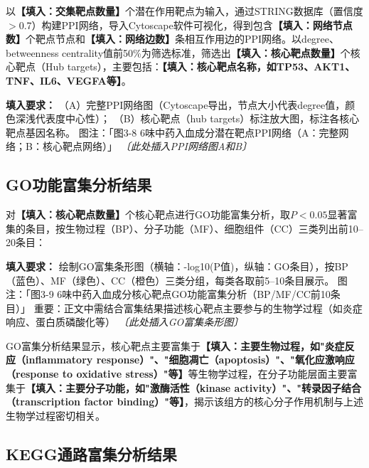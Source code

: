 \documentclass[12pt,a4paper,UTF8,openany]{ctexbook}
\begin{document}
以\textbf{【填入：交集靶点数量】}个潜在作用靶点为输入，通过STRING数据库（置信度$>$0.7）构建PPI网络，导入Cytoscape软件可视化，得到包含\textbf{【填入：网络节点数】}个靶点节点和\textbf{【填入：网络边数】}条相互作用边的PPI网络。以degree、betweenness centrality值前50\%为筛选标准，筛选出\textbf{【填入：核心靶点数量】}个核心靶点（Hub targets），主要包括：\textbf{【填入：核心靶点名称，如TP53、AKT1、TNF、IL6、VEGFA等】}。

\begin{tcolorbox}[colback=orange!5!white,colframe=orange!60!black,title={\textbf{【待填入】图3-8：PPI网络图及核心靶点可视化}},fonttitle=\small\bfseries]
\textbf{填入要求：}
（A）完整PPI网络图（Cytoscape导出，节点大小代表degree值，颜色深浅代表度中心性）；
（B）核心靶点（hub targets）标注放大图，标注各核心靶点基因名称。
图注：「图3-8 6味中药入血成分潜在靶点PPI网络（A：完整网络；B：核心靶点网络）」
\textit{〔此处插入PPI网络图A和B〕}
\end{tcolorbox}

\subsection{GO功能富集分析结果}

对\textbf{【填入：核心靶点数量】}个核心靶点进行GO功能富集分析，取$P < 0.05$显著富集的条目，按生物过程（BP）、分子功能（MF）、细胞组件（CC）三类列出前10--20条目：

\begin{tcolorbox}[colback=orange!5!white,colframe=orange!60!black,title={\textbf{【待填入】图3-9：GO富集分析条形图}},fonttitle=\small\bfseries]
\textbf{填入要求：}
绘制GO富集条形图（横轴：-log10(P值)，纵轴：GO条目），按BP（蓝色）、MF（绿色）、CC（橙色）三类分组，每类各取前5--10条目展示。
图注：「图3-9 6味中药入血成分核心靶点GO功能富集分析（BP/MF/CC前10条目）」
重要：正文中需结合富集结果描述核心靶点主要参与的生物学过程（如炎症响应、蛋白质磷酸化等）
\textit{〔此处插入GO富集条形图〕}
\end{tcolorbox}

GO富集分析结果显示，核心靶点主要富集于\textbf{【填入：主要生物过程，如"炎症反应（inflammatory response）"、"细胞凋亡（apoptosis）"、"氧化应激响应（response to oxidative stress）"等】}等生物学过程，在分子功能层面主要富集于\textbf{【填入：主要分子功能，如"激酶活性（kinase activity）"、"转录因子结合（transcription factor binding）"等】}，揭示该组方的核心分子作用机制与上述生物学过程密切相关。

\subsection{KEGG通路富集分析结果}
\end{document}
